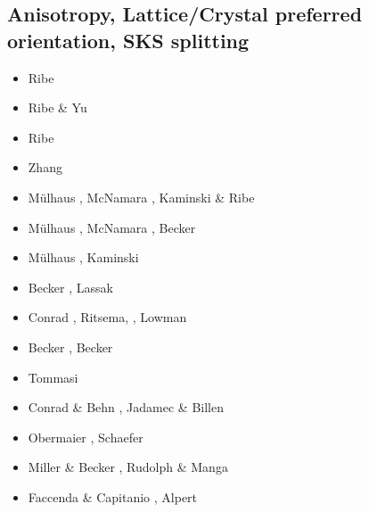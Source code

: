 \subsection{Anisotropy, Lattice/Crystal preferred orientation, SKS splitting}
\label{sec:topics:anisotropy}

\begin{scriptsize}
\begin{itemize}
\item[\nineteeneightynine] Ribe \cite{ribe89b,ribe89c}
\item[\nineteenninetyone] Ribe \& Yu \cite{riyu91}
\item[\nineteenninetytwo] Ribe \cite{ribe92b}
\item[\nineteeneightythree] Zhang \etal \cite{zhhj93}
\item[\twothousandtwo] M\"ulhaus \etal \cite{mudm02}, McNamara \etal \cite{mcvk02}, 
                       Kaminski \& Ribe \cite{kari02}
\item[\twothousandthree] M\"ulhaus \etal \cite{mumc03}, McNamara \etal \cite{mcvk03},
                         Becker \etal \cite{beke03}
\item[\twothousandfour] M\"ulhaus \etal \cite{mumc04}, Kaminski \etal \cite{karb04}
\item[\twothousandsix] Becker \etal \cite{besb06}, Lassak \etal \cite{lafh06}
\item[\twothousandseven] Conrad \etal \cite{cobs07}, Ritsema, \etal \cite{rimb07}, Lowman \etal \cite{lopk07}
\item[\twothousandeight] Becker \etal \cite{beke08}, Becker \cite{beck08}
\item[\twothousandnine] Tommasi \etal \cite{tokv09}
\item[\twothousandten] Conrad \& Behn \cite{cobe10}, Jadamec \& Billen \cite{jabi10a}
\item[\twothousandeleven] Obermaier \etal \cite{obbh11}, Schaefer \etal \cite{scbb11}
\item[\twothousandtwelve] Miller \& Becker \cite{mibe12}, Rudolph \& Manga \cite{ruma12}
\item[\twothousandthirteen] Faccenda \& Capitanio \cite{faca13}, Alpert \etal \cite{almb13}

\end{itemize}
\end{scriptsize}
